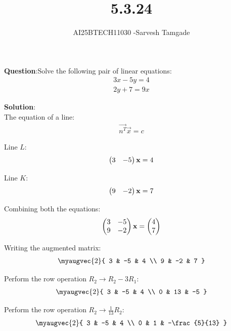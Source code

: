 \documentclass[journal]{IEEEtran}
\begin{document}

\vspace{3cm}

\title{5.3.24}
\author{AI25BTECH11030 -Sarvesh Tamgade}
{\let\newpage\relax\maketitle}

\renewcommand{\thefigure}{\theenumi}
\renewcommand{\thetable}{\theenumi}
\setlength{\intextsep}{10pt} 


\renewcommand{\thetable}{\theenumi}


\textbf{Question}:Solve the following pair of linear equations:
\begin{align}
   3x - 5y = 4 
\end{align}
\begin{align}
    2y + 7 = 9x
\end{align}

\textbf{Solution}: \\
The equation of a line:
\begin{align}
\vec{n^T} \vec{x} = c
\end{align}

Line \(L\):
\begin{align}
\begin{pmatrix}3 & -5\end{pmatrix} \mathbf{x} = 4
\end{align}

Line \(K\):
\begin{align}
\begin{pmatrix}9 & -2\end{pmatrix} \mathbf{x} = 7
\end{align}

Combining both the equations:
\begin{align}
\begin{pmatrix}3 & -5 \\ 9 & -2\end{pmatrix} \mathbf{x} = \begin{pmatrix}4 \\ 7\end{pmatrix}
\end{align}

Writing the augmented matrix:
\begin{align}
\myaugvec{2}{
3 & -5 & 4 \\
9 & -2 & 7
}
\end{align}

Perform the row operation \( R_2 \to R_2 - 3 R_1 \):
\begin{align}
\myaugvec{2}{
3 & -5 & 4 \\
0 & 13 & -5
}
\end{align}

Perform the row operation \( R_2 \to \frac{1}{13} R_2 \):
\begin{align}
\myaugvec{2}{
3 & -5 & 4 \\
0 & 1 & -\frac{5}{13}
}
\end{align}
\end{document}
